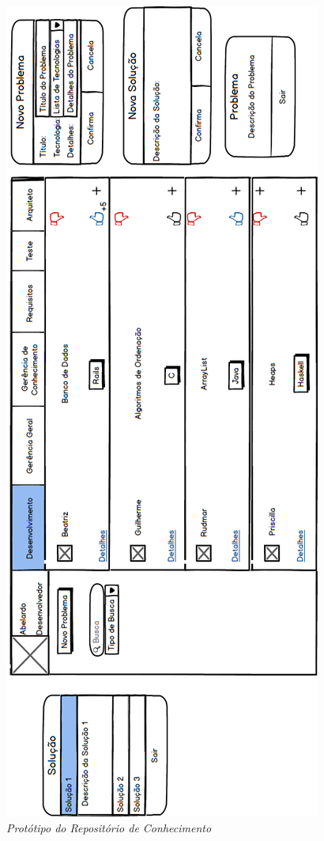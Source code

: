 \begin{apendicesenv}
\begin{figure}[H]
\centering\includegraphics[scale=0.4]{figuras/prototipo.png}
\caption{\textit{Protótipo do Repositório de Conhecimento}}
\end{figure}


\end{apendicesenv}
